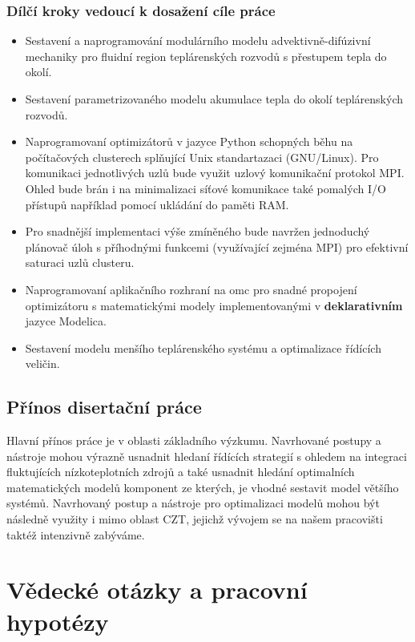 \subsection*{Dílčí kroky vedoucí k dosažení cíle práce}
\begin{itemize}
  \item
    Sestavení a naprogramování modulárního modelu advektivně-difúzivní
    mechaniky pro fluidní region teplárenských rozvodů s přestupem tepla do
    okolí.
  \item
    Sestavení parametrizovaného modelu akumulace tepla do okolí teplárenských
    rozvodů.
  \item
    Naprogramovaní optimizátorů v jazyce Python schopných běhu na počítačových
    clusterech splňující Unix standartazaci (GNU/Linux). Pro komunikaci
    jednotlivých uzlů bude využit uzlový komunikační protokol MPI. Ohled bude
    brán i na minimalizaci síťové komunikace také pomalých I/O přístupů
    například pomocí ukládání do paměti RAM.
  \item
    Pro snadnější implementaci výše zmíněného bude navržen jednoduchý plánovač
    úloh s příhodnými funkcemi (využívající zejména MPI) pro efektivní saturaci
    uzlů clusteru.
  \item
    Naprogramovaní aplikačního rozhraní na \acrshort{omc} pro snadné propojení
    optimizátoru s matematickými modely implementovanými v
    \textbf{deklarativním} jazyce Modelica.
  \item
    Sestavení modelu menšího teplárenského systému a optimalizace řídících
    veličin.
\end{itemize}
\section{Přínos disertační práce}
\label{sec:prinos}
Hlavní přínos práce je v oblasti základního výzkumu. Navrhované postupy a
nástroje mohou výrazně usnadnit hledaní řídících strategií s ohledem na
integraci fluktujících nízkoteplotních zdrojů a také usnadnit hledání
optimalních matematických modelů komponent ze kterých, je vhodné sestavit model
většího systémů. Navrhovaný postup a nástroje pro optimalizaci modelů mohou být
následně využity i mimo oblast CZT, jejichž vývojem se na našem pracovišti
taktéž intenzivně zabýváme.

\chapter{Vědecké otázky a pracovní hypotézy}
\label{chap:SciQaH}
